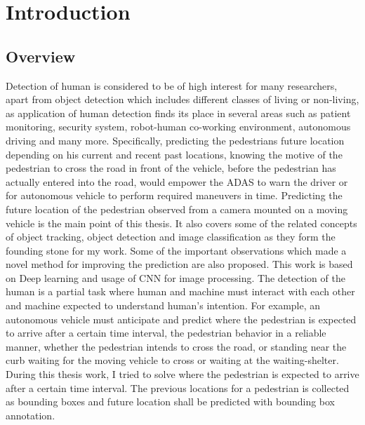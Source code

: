 \pagestyle{fancy}
\fancyhf{}
\fancyhead[EL]{\leftmark} %
\fancyhead[OL]{\leftmark}
\fancyhead[ER,OR]{\thepage}

\setcounter{page}{1}

\chapter{Introduction}
\section{Overview}
Detection of human is considered to be of high interest for many researchers, apart from object detection which includes different classes of living or non-living, as application of human detection finds its place in several areas such as patient monitoring, security system, robot-human co-working environment, autonomous driving and many more. Specifically, predicting the pedestrians future 
location depending on his current and recent past locations, knowing the motive of the pedestrian to cross the road in front of the vehicle, before the pedestrian has actually entered into the road, would empower the ADAS to warn the driver or for autonomous vehicle to perform required maneuvers in time.
Predicting the future location of the pedestrian observed from a camera mounted on a moving vehicle is the main point of this thesis. It also covers some of the related concepts of object tracking, object detection and image classification as they form the founding stone for my work. Some of the important observations which made a novel method for improving the prediction are also proposed. This work is based on Deep learning and usage of CNN for image processing. The detection of the human is a partial task where human and machine must interact with each other and machine expected to understand human's intention. For example, an autonomous vehicle must anticipate and predict where the pedestrian is expected to arrive after a certain time interval, the pedestrian behavior in a reliable manner, whether the pedestrian intends to cross the road, or standing near the curb waiting for the moving vehicle to cross or waiting at the waiting-shelter. During this thesis work, I tried to solve where the pedestrian is expected to arrive after a certain time interval. The previous locations for a pedestrian is collected as bounding boxes and future location shall be predicted with bounding box annotation.

